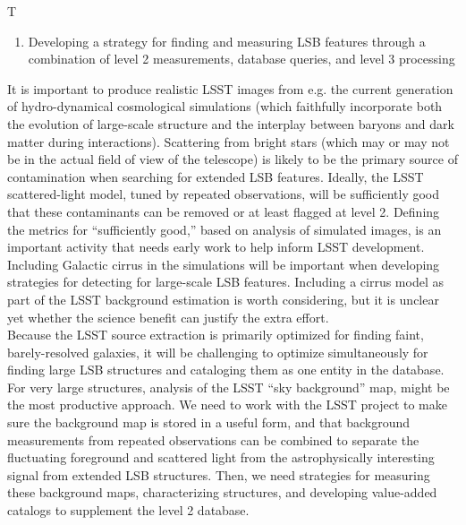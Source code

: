 \begin{tasklist}{T}
\begin{task}
{\begin{enumerate}
\item Developing a strategy for finding and measuring  LSB features  through  a combination of level 2 measurements, database queries, and level 3 processing
\end{enumerate}
It is important to produce realistic LSST images from e.g. the current generation of hydro-dynamical cosmological simulations (which faithfully incorporate both the evolution of large-scale structure and the interplay between baryons and dark matter during interactions). Scattering from bright stars (which may or may not be in the actual field of view of the  telescope) is likely to be the  primary source of contamination when searching  for extended  LSB features. Ideally,  the  LSST scattered-light model, tuned  by  repeated   observations, will be  sufficiently  good that these contaminants can be removed  or at  least flagged at  level 2.  Defining the metrics for “sufficiently good,” based on analysis of simulated images, is an important activity that needs early  work to  help inform  LSST development.
\\
Including  Galactic  cirrus  in the simulations will be important when developing strategies for detecting for large-scale  LSB features.   Including  a cirrus  model as part  of the  LSST background  estimation is worth  considering,  but  it is unclear  yet whether  the science benefit can justify the extra  effort.
\\
Because  the  LSST  source  extraction is primarily  optimized  for finding  faint,  barely-resolved  galaxies,  it  will  be challenging  to  optimize  simultaneously for finding large LSB structures and cataloging  them  as one entity  in the database. For very large structures, analysis of the LSST “sky background” map, might be the most productive approach. We need to work with the LSST project to make sure the background  map is stored in a useful form, and that background  measurements from repeated  observations can  be combined  to separate  the  fluctuating foreground  and  scattered light from the astrophysically interesting signal from extended  LSB structures. Then, we need strategies for measuring these background  maps,  characterizing structures,  and  developing value-added  catalogs  to supplement the level 2 database.
\\
}
\end{task}
\end{tasklist}
